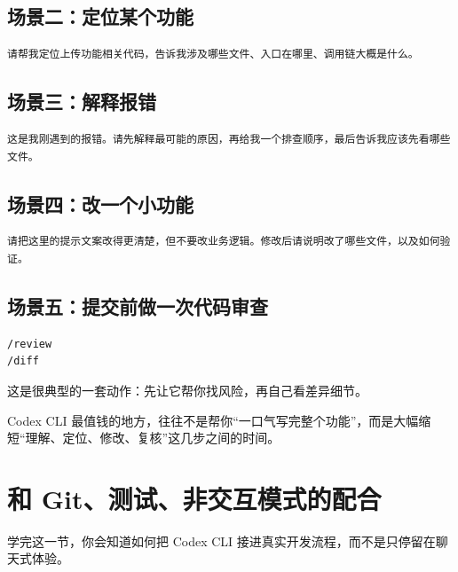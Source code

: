 \documentclass[UTF8,a4paper,12pt]{ctexart}
\begin{document}
\subsection{场景二：定位某个功能}

\begin{lstlisting}[style=prompt]
请帮我定位上传功能相关代码，告诉我涉及哪些文件、入口在哪里、调用链大概是什么。
\end{lstlisting}

\subsection{场景三：解释报错}

\begin{lstlisting}[style=prompt]
这是我刚遇到的报错。请先解释最可能的原因，再给我一个排查顺序，最后告诉我应该先看哪些文件。
\end{lstlisting}

\subsection{场景四：改一个小功能}

\begin{lstlisting}[style=prompt]
请把这里的提示文案改得更清楚，但不要改业务逻辑。修改后请说明改了哪些文件，以及如何验证。
\end{lstlisting}

\subsection{场景五：提交前做一次代码审查}

\begin{lstlisting}[style=cli]
/review
/diff
\end{lstlisting}

这是很典型的一套动作：先让它帮你找风险，再自己看差异细节。

\begin{sumbox}
Codex CLI 最值钱的地方，往往不是帮你“一口气写完整个功能”，而是大幅缩短“理解、定位、修改、复核”这几步之间的时间。
\end{sumbox}

\section{和 Git、测试、非交互模式的配合}

\begin{learnbox}
学完这一节，你会知道如何把 Codex CLI 接进真实开发流程，而不是只停留在聊天式体验。
\end{learnbox}
\end{document}
